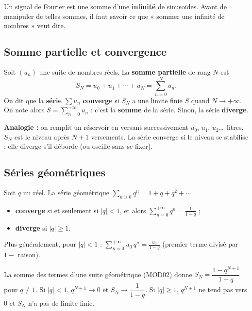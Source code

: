 \documentclass[a4paper,11pt]{article}
\begin{document}
Un signal de Fourier est une somme d'une \textbf{infinité} de sinusoïdes. Avant de manipuler de telles sommes, il faut savoir ce que « sommer une infinité de nombres » veut dire.

\subsection{Somme partielle et convergence}\label{subsec:convergence}

\begin{definition}
Soit $(u_n)$ une suite de nombres réels. La \textbf{somme partielle} de rang $N$ est
\[
S_N = u_0 + u_1 + \cdots + u_N = \sum_{n=0}^{N} u_n.
\]
On dit que la \textbf{série} $\sum u_n$ \textbf{converge} si $S_N$ a une limite finie $S$ quand $N\to+\infty$. On note alors $S = \displaystyle\sum_{n=0}^{+\infty} u_n$ : c'est la \textbf{somme} de la série. Sinon, la série \textbf{diverge}.
\end{definition}

\begin{tcolorbox}[colback=white, colframe=uimmblue, boxrule=0.8pt, arc=3pt]
\textbf{Analogie :} on remplit un réservoir en versant successivement $u_0$, $u_1$, $u_2$\dots\ litres. $S_N$ est le niveau après $N+1$ versements. La série converge si le niveau se stabilise ; elle diverge s'il déborde (ou oscille sans se fixer).
\end{tcolorbox}

\subsection{Séries géométriques}\label{subsec:geometriques}

\begin{theoreme}\label{th:geometrique}
Soit $q$ un réel. La série géométrique $\displaystyle\sum_{n\geq 0} q^n = 1 + q + q^2 + \cdots$
\begin{itemize}
  \item \textbf{converge} si et seulement si $|q| < 1$, et alors $\displaystyle\sum_{n=0}^{+\infty} q^n = \frac{1}{1-q}$ ;
  \item \textbf{diverge} si $|q|\geq 1$.
\end{itemize}
Plus généralement, pour $|q|<1$ : $\displaystyle\sum_{n=0}^{+\infty} u_0\,q^n = \frac{u_0}{1-q}$ \quad(premier terme divisé par $1 - $ raison).
\end{theoreme}

\begin{remarque}
La somme des termes d'une suite géométrique (MOD02) donne $S_N = \dfrac{1-q^{N+1}}{1-q}$ pour $q\neq 1$. Si $|q|<1$, $q^{N+1}\to 0$ et $S_N\to\dfrac{1}{1-q}$. Si $|q|\geq 1$, $q^{N+1}$ ne tend pas vers $0$ et $S_N$ n'a pas de limite finie.
\end{remarque}
\end{document}
